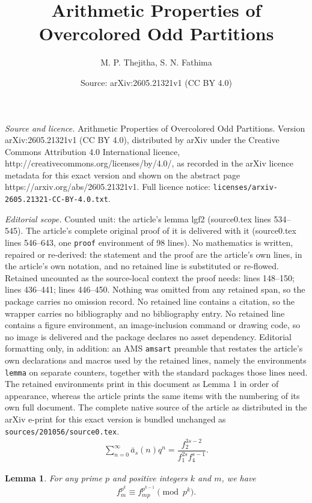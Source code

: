 \documentclass[10pt,a4paper]{amsart}
\title{Arithmetic Properties of Overcolored Odd Partitions}
\author{M. P. Thejitha, S. N. Fathima}
\date{Source: arXiv:2605.21321v1 (CC BY 4.0)}
\newtheorem{lemma}{Lemma}
\begin{document}
\maketitle

\noindent\emph{Source and licence.} Arithmetic Properties of Overcolored Odd Partitions. Version arXiv:2605.21321v1 (CC BY 4.0), distributed by arXiv under the Creative Commons Attribution 4.0 International licence, http://creativecommons.org/licenses/by/4.0/, as recorded in the arXiv licence metadata for this exact version and shown on the abstract page https://arxiv.org/abs/2605.21321v1. Full licence notice: \texttt{licenses/arxiv-2605.21321-CC-BY-4.0.txt}.\par\smallskip

\noindent\textit{Editorial scope.} Counted unit: the article's lemma lgf2 (source0.tex lines 534--545). The article's complete original proof of it is delivered with it (source0.tex lines 546--643, one \texttt{proof} environment of 98 lines). No mathematics is written, repaired or re-derived: the statement and the proof are the article's own lines, in the article's own notation, and no retained line is substituted or re-flowed.  Retained uncounted as the source-local context the proof needs: lines 148--150; lines 436--441; lines 446--450.  Nothing was omitted from any retained span, so the package carries no omission record.  No retained line contains a citation, so the wrapper carries no bibliography and no bibliography entry.  No retained line contains a figure environment, an image-inclusion command or drawing code, so no image is delivered and the package declares no asset dependency.  Editorial formatting only, in addition: an AMS \texttt{amsart} preamble that restates the article's own declarations and macros used by the retained lines, namely the environments \texttt{lemma} on separate counters, together with the standard packages those lines need.  The retained environments print in this document as Lemma 1 in order of appearance, whereas the article prints the same items with the numbering of its own full document.  The complete native source of the article as distributed in the arXiv e-print for this exact version is bundled unchanged as \texttt{sources/201056/source0.tex}.
	\begin{align}\label{gf}
		\sum_{n=0}^{\infty}\bar{a}_s(n)q^n=\dfrac{f_2^{3s-2}}{f_1^{2s}f_4^{s-1}}.
	\end{align}

\begin{lemma}\label{bt}
	For any prime $p$ and positive integers $k$ and $m$, we have
	\begin{align*}
		f_m^{p^k} \equiv f_{mp}^{p^{k-1}} \pmod{p^k}.
	\end{align*}
\end{lemma}
\end{document}
